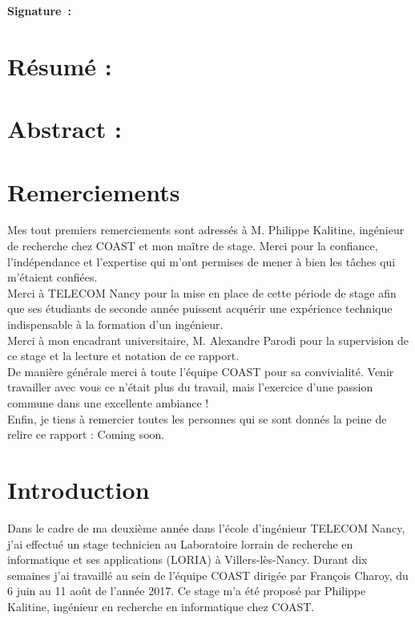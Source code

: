\documentclass[12pt]{article}
\begin{document}
\begin{center}
\textbf{Signature~:}
\end{center}

\newpage
\thispagestyle{empty}
\section*{Résumé :}

\section*{Abstract :}



\newpage
\thispagestyle{empty}
\section*{Remerciements}
Mes tout premiers remerciements sont adressés à M. Philippe Kalitine, ingénieur de recherche chez COAST et mon maître de stage. Merci pour la confiance, l'indépendance et l'expertise qui m'ont permises de mener à bien les tâches qui m'étaient confiées.\\

Merci à TELECOM Nancy pour la mise en place de cette période de stage afin que ses étudiants de seconde année puissent acquérir une expérience technique indispensable à la formation d'un ingénieur.\\

Merci à mon encadrant universitaire, M. Alexandre Parodi pour la supervision de ce stage et la lecture et notation de ce rapport.\\

De manière générale merci à toute l'équipe COAST pour sa convivialité. Venir travailler avec vous ce n'était plus du travail, mais l'exercice d'une passion commune dans une excellente ambiance !\\

Enfin, je tiens à remercier toutes les personnes qui se sont donnés la peine de relire ce rapport : Coming soon.

\newpage
\thispagestyle{empty}
\tableofcontents

\newpage
\setcounter{page}{1}
\section*{Introduction}
Dans le cadre de ma deuxième année dans l'école d'ingénieur TELECOM Nancy, j'ai effectué un stage technicien au Laboratoire lorrain de recherche en informatique et ses applications (LORIA) \cite{loria} à Villers-lès-Nancy. Durant dix semaines j'ai travaillé au sein de l'équipe COAST \cite{coast} dirigée par François Charoy, du 6 juin au 11 août de l'année 2017. Ce stage m'a été proposé par Philippe Kalitine, ingénieur en recherche en informatique chez COAST.\\
\end{document}
